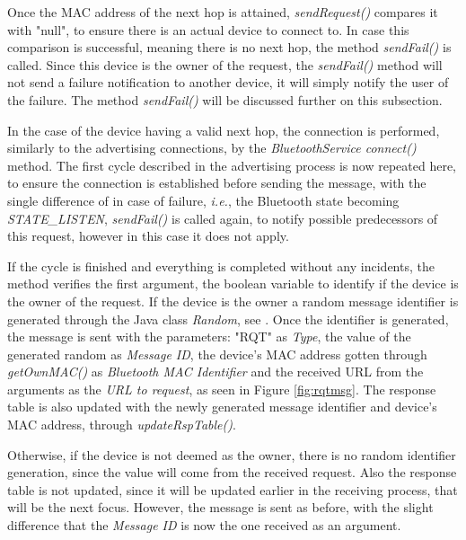 Once the \gls{MAC} address of the next hop is attained, \textit{sendRequest()} compares it with "null", to ensure there is an actual device to connect to. In case this comparison is successful, meaning there is no next hop, the method \textit{sendFail()} is called. Since this device is the owner of the request, the \textit{sendFail()} method will not send a failure notification to another device, it will simply notify the user of the failure. The method \textit{sendFail()} will be discussed further on this subsection.

In the case of the device having a valid next hop, the connection is performed, similarly to the advertising connections, by the \textit{BluetoothService connect()} method. The first cycle described in the advertising process is now repeated here, to ensure the connection is established before sending the message, with the single difference of in case of failure, \textit{i.e.}, the Bluetooth state becoming \textit{STATE\_LISTEN}, \textit{sendFail()} is called again, to notify possible predecessors of this request, however in this case it does not apply.

If the cycle is finished and everything is completed without any incidents, the method verifies the first argument, the boolean variable to identify if the device is the owner of the request. If the device is the owner a random message identifier is generated through the Java class \textit{Random}, see \cite{random}. Once the identifier is generated, the message is sent with the parameters: "RQT" as \textit{Type}, the value of the generated random as \textit{Message ID}, the device's \gls{MAC} address gotten through \textit{getOwnMAC()} as \textit{Bluetooth MAC Identifier} and the received \gls{URL} from the arguments as the \textit{\gls{URL} to request}, as seen in Figure \ref{fig:rqtmsg}. The response table is also updated with the newly generated message identifier and device's \gls{MAC} address, through \textit{updateRspTable()}.

Otherwise, if the device is not deemed as the owner, there is no random identifier generation, since the value will come from the received request. Also the response table is not updated, since it will be updated earlier in the receiving process, that will be the next focus. However, the message is sent as before, with the slight difference that the \textit{Message ID} is now the one received as an argument.

